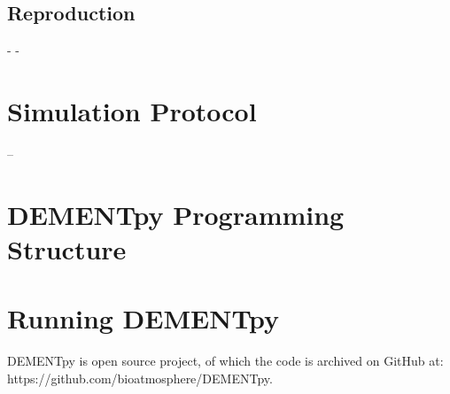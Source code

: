 \documentclass[12pt, oneside, titlepage]{article}      %
\begin{document}
\subsection{Reproduction}
-
-



\section{Simulation Protocol}
--

\section{DEMENTpy Programming Structure}




\section{Running DEMENTpy}

DEMENTpy is open source project, of which the code is archived on GitHub at: https://github.com/bioatmosphere/DEMENTpy.
\end{document}
